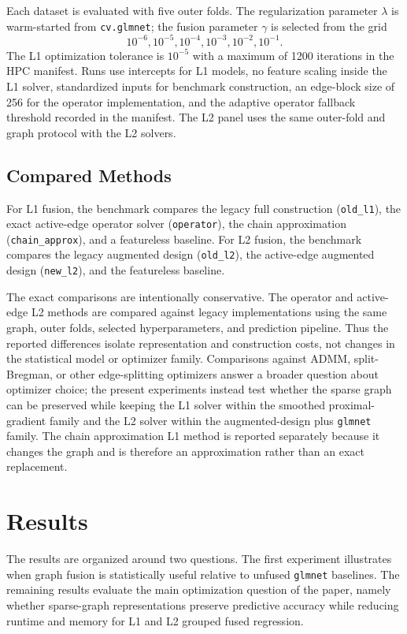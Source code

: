 \documentclass[twoside,11pt]{article}
\begin{document}
Each dataset is evaluated with five outer folds. The regularization parameter
$\lambda$ is warm-started from \texttt{cv.glmnet}; the fusion parameter
$\gamma$ is selected from the grid
\[
  10^{-6}, 10^{-5}, 10^{-4}, 10^{-3}, 10^{-2}, 10^{-1}.
\]
The L1 optimization tolerance is $10^{-5}$ with a maximum of 1200 iterations
in the HPC manifest. Runs use intercepts for L1 models, no feature scaling
inside the L1 solver, standardized inputs for benchmark construction, an
edge-block size of 256 for the operator implementation, and the adaptive
operator fallback threshold recorded in the manifest. The L2 panel uses the
same outer-fold and graph protocol with the L2 solvers.

\subsection{Compared Methods}

For L1 fusion, the benchmark compares the legacy full construction
(\texttt{old\_l1}), the exact active-edge operator solver
(\texttt{operator}), the chain approximation (\texttt{chain\_approx}),
and a featureless baseline. For L2 fusion, the benchmark compares the legacy
augmented design (\texttt{old\_l2}), the active-edge augmented design
(\texttt{new\_l2}), and the featureless baseline.

The exact comparisons are intentionally conservative. The operator and
active-edge L2 methods are compared against legacy implementations using the
same graph, outer folds, selected hyperparameters, and prediction pipeline.
Thus the reported differences isolate representation and construction costs,
not changes in the statistical model or optimizer family. Comparisons against
ADMM, split-Bregman, or other edge-splitting optimizers answer a broader
question about optimizer choice; the present experiments instead test whether
the sparse graph can be preserved while keeping the L1 solver within the
smoothed proximal-gradient family and the L2 solver within the
augmented-design plus \texttt{glmnet} family.
The chain approximation L1 method is reported separately because
it changes the graph and is therefore an approximation rather than an exact
replacement.

\section{Results}

The results are organized around two questions. The first experiment
illustrates when graph fusion is statistically useful relative to unfused
\texttt{glmnet} baselines. The remaining results evaluate the main
optimization question of the paper, namely whether sparse-graph
representations preserve predictive accuracy while reducing runtime and memory
for L1 and L2 grouped fused regression.
\end{document}
